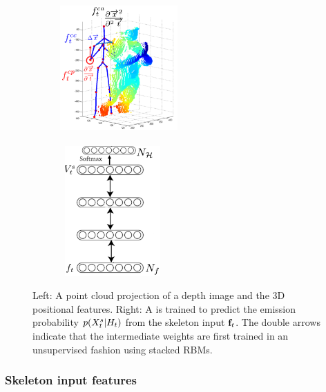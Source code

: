 \begin{figure}[t]
       \centering
        \begin{subfigure}[c]{0.2\textwidth}
        \centering
                \includegraphics[width=4.5cm,height=5cm, clip]{images/point_cloud}
        \end{subfigure}%
        \hfill
        \begin{subfigure}[c]{0.2\textwidth}
        \centering
                \includegraphics[width=4cm,height=5cm, clip]{images/DBN}
        \end{subfigure}
  \caption{
\small{ Left: A point cloud projection of a depth image and the 3D positional features.
  Right: A \DBN is trained to predict the emission probability  $p(X^{s}_t|H_t)$
  from the  skeleton input $\mathbf{f}_t$.
  The double arrows indicate that the intermediate weights are first trained in an unsupervised fashion using stacked RBMs.
  }}
  \label{fig:DBN}\label{point_cloud}
\end{figure}


\subsubsection{Skeleton input features}

